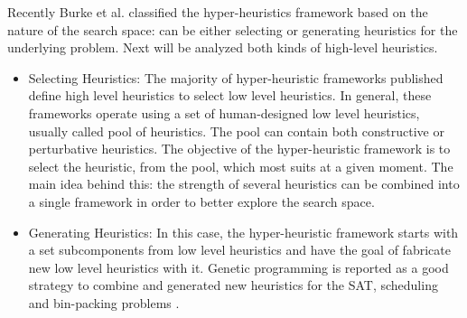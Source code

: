 \documentclass[conference]{IEEEtran}
\begin{document}

Recently Burke et al. \cite{burke2010classification} classified the hyper-heuristics framework based on the nature of the search space: can be either selecting or generating heuristics for the underlying problem. Next will be analyzed both kinds of high-level heuristics.


\begin{itemize}
	\item Selecting Heuristics: The majority of hyper-heuristic frameworks published define high level heuristics to select low level heuristics. In general, these frameworks operate using a set of human-designed low level heuristics, usually called pool of heuristics. The pool can contain both constructive or perturbative heuristics. The objective of the hyper-heuristic framework is to select the heuristic, from the pool, which most suits at a given moment. The main idea behind this: the strength of several heuristics can be combined into a single framework in order to better explore the search space. 
	\item Generating Heuristics: In this case, the hyper-heuristic framework starts with a set subcomponents from low level heuristics and have the goal of fabricate new low level heuristics with it. Genetic programming is reported as a good strategy to combine and generated new heuristics for the SAT, scheduling and bin-packing problems \cite{sabar2015automatic}.
\end{itemize}
\end{document}
